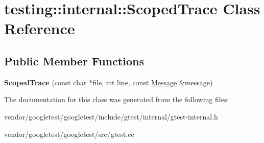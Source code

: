\hypertarget{classtesting_1_1internal_1_1_scoped_trace}{}\section{testing\+:\+:internal\+:\+:Scoped\+Trace Class Reference}
\label{classtesting_1_1internal_1_1_scoped_trace}
\subsection*{Public Member Functions}
\begin{DoxyCompactItemize}
\item 
\mbox{\label{classtesting_1_1internal_1_1_scoped_trace_ab965d7010bbbc82c1bef6ebf8748bede}} 
{\bfseries Scoped\+Trace} (const char $\ast$file, int line, const \mbox{\hyperlink{classtesting_1_1_message}{Message}} \&message)
\end{DoxyCompactItemize}


The documentation for this class was generated from the following files\+:\begin{DoxyCompactItemize}
\item 
vendor/googletest/googletest/include/gtest/internal/gtest-\/internal.\+h\item 
vendor/googletest/googletest/src/gtest.\+cc\end{DoxyCompactItemize}
